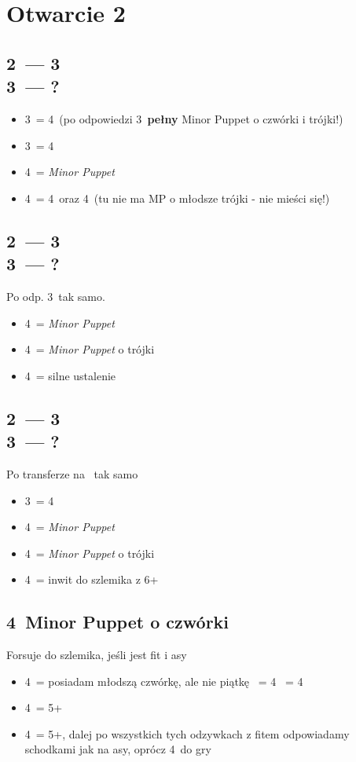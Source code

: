 \documentclass[12pt, a4paper]{article}
\begin{document}
\pagebreak
\section{Otwarcie 2\ntx}
\subsection*{2\ntx\ --- 3\clubs \\ 3\diams\ --- ?}
\begin{itemize}
    \item 3\hearts\ = 4\spades\ (po odpowiedzi 3\nt\ \textbf{pełny} Minor Puppet o czwórki i trójki!)
    \item 3\spades\ = 4\hearts
    \item 4\clubs\ = \emph{Minor Puppet}
    \item 4\diams\ = 4\hearts\ oraz 4\spades\ (tu nie ma MP o młodsze trójki - nie mieści się!)
\end{itemize}

\subsection*{2\ntx\ --- 3\clubs \\ 3\spades\ --- ?}
Po odp. 3\hearts\ tak samo.
\begin{itemize}
    \item 4\clubs\ = \emph{Minor Puppet}
    \item 4\diams\ = \emph{Minor Puppet} o trójki
    \item 4\hearts\ = silne ustalenie \spades
\end{itemize}

\subsection*{2\ntx\ --- 3\diams \\ 3\hearts\ --- ?}
Po transferze na \spades\ tak samo
\begin{itemize}
    \item 3\spades\ = 4\hearts
    \item 4\clubs\ = \emph{Minor Puppet}
    \item 4\diams\ = \emph{Minor Puppet} o trójki
    \item 4\hearts\ = inwit do szlemika z 6+\hearts
\end{itemize}

\subsection*{4\clubs\ Minor Puppet o czwórki}
Forsuje do szlemika, jeśli jest fit i asy
\begin{itemize}
    \item 4\diams\ = posiadam młodszą czwórkę, ale nie piątkę
    \hearts\ = 4\clubs
    \spades\ = 4\diams
    \item 4\hearts\ = 5+\clubs
    \item 4\spades\ = 5+\diams, dalej po wszystkich tych odzywkach z fitem odpowiadamy schodkami jak na asy, oprócz 4\nt\ do gry
\end{itemize}
\end{document}
